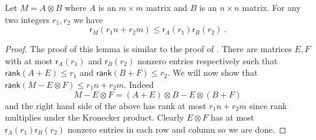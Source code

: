 \documentclass{toc}
\newcommand\rank{\textsf{rank}}
\begin{document}
\begin{lemma}\label{products}
Let $M = A \otimes B$ where $A$ is an $m \times m$ matrix and $B$ is an $n \times n$ matrix.  For any two integers $r_1,r_2$ we have
\[\textsf{r}_M(r_1n + r_2m) \leq \textsf{r}_A(r_1)\textsf{r}_B(r_2) \,. \]
\end{lemma}
\begin{proof}
The proof of this lemma is similar to the proof of .  There are matrices $E,F$ with at most $\textsf{r}_A(r_1)$ and $\textsf{r}_B(r_2)$ nonzero entries respectively such that $\rank(A+E) \leq r_1$ and $\rank(B+F) \leq r_2$.  We will now show that $\rank(M - E \otimes F) \leq r_1n + r_2m$.  Indeed
\[
M - E \otimes F = (A+E) \otimes B - E \otimes (B+F)
\]
and the right hand side of the above has rank at most $r_1n + r_2m$ since rank multiplies under the Kronecker product.  Clearly $E \otimes F$ has at most $\textsf{r}_A(r_1)\textsf{r}_B(r_2)$ nonzero entries in each row and column so we are done.
\end{proof}
\end{document}
